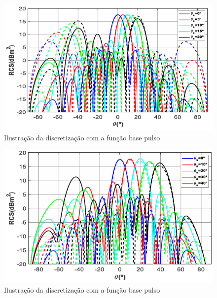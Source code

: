 \documentclass[
	12pt,				%
	openright,			%
	oneside,			%
	a4paper,			%
	english,			%
	brazil				%
	]{abntex2}
\begin{document}
\begin{figure}[htb]
 \label{RCS5}
    \centering
    \caption{Ilustração da discretização  com a função base pulso} \label{fig_minipage}
    \includegraphics[width=\textwidth]{figures/RCSBeam5.png}
  \hfill
  
\end{figure}


\begin{figure}[htb]
 \label{RCS10}
    \centering
    \caption{Ilustração da discretização  com a função base pulso} \label{fig_minipage}
    \includegraphics[width=\textwidth]{figures/RCSBeam10.png}
  \hfill
\end{figure}
\end{document}
